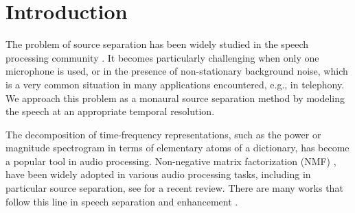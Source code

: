 \section{Introduction}

The problem of source separation has been widely
studied in the speech processing community \cite{loizou2007speech,hansler2008speech}. 
It becomes particularly challenging when only one microphone is used, or in the presence of 
non-stationary background noise, which is a very common situation in many applications encountered, e.g., in telephony.
We approach this problem as a monaural source separation method
by modeling the speech at an appropriate temporal resolution.

The decomposition of time-frequency representations, such as the power or magnitude spectrogram
in terms of elementary atoms of a dictionary, has become a popular tool in audio processing. 
Non-negative matrix factorization (NMF) \cite{NMF},
have been widely adopted in various audio processing tasks, including in particular source separation, see \cite{smaragdis2014static} for a recent review. 
There are many works that follow this line in speech separation \cite{schmidt06speechseparation,shashanka_icassp07} and enhancement \cite{DuanMS12,mohammadiha2013supervised}. %

%

